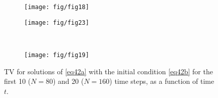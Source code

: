 \documentclass[reqno,a4paper,12pt]{amsart}
\begin{document}
\begin{figure}[htb!]
\centering
     \begin{subfigure}[b]{0.45\textwidth}
         \centering
         \texttt{[image: fig/fig18]}
     \end{subfigure} \quad
     \begin{subfigure}[b]{0.45\textwidth}
         \centering
         \texttt{[image: fig/fig23]}
     \end{subfigure}
     \hfill \\ \vspace{1em}
      \begin{subfigure}[b]{0.45\textwidth}
         \centering
         \texttt{[image: fig/fig19]}
     \end{subfigure} \quad
        
        \caption{TV for solutions of \eqref{eq42a} with the initial condition \eqref{eq42b} for the first 10 ($N = 80$) and 20 ($N = 160$) time steps, as a function of time $t$. %
        }
        \label{fig:3}
\end{figure}
\end{document}
